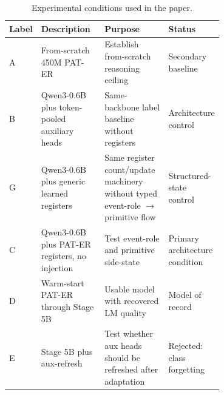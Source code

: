 \begin{table}[H]
\caption{Experimental conditions used in the paper.\label{tab:conditions}}
\footnotesize
\begin{tabularx}{\textwidth}{@{}p{0.08\linewidth}p{0.31\linewidth}p{0.31\linewidth}X@{}}
\toprule
\textbf{Label} & \textbf{Description} & \textbf{Purpose} & \textbf{Status} \\
\midrule
A & From-scratch 450M PAT-ER & Establish from-scratch reasoning ceiling & Secondary baseline \\
B & Qwen3-0.6B plus token-pooled auxiliary heads & Same-backbone label baseline without registers & Architecture control \\
G & Qwen3-0.6B plus generic learned registers & Same register count/update machinery without typed event-role $\rightarrow$ primitive flow & Structured-state control \\
C & Qwen3-0.6B plus PAT-ER registers, no injection & Test event-role and primitive side-state & Primary architecture condition \\
D & Warm-start PAT-ER through Stage 5B & Usable model with recovered LM quality & Model of record \\
E & Stage 5B plus aux-refresh & Test whether aux heads should be refreshed after adaptation & Rejected: class forgetting \\
\bottomrule
\end{tabularx}
\end{table}
